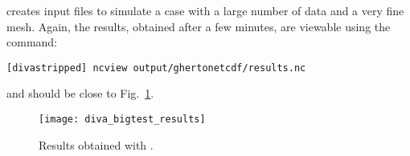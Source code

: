  creates input files to simulate a case with a large number of data and a very fine mesh. Again, the results, obtained after a few minutes, are viewable using the command:
\begin{lstlisting}[style=Bash]
[divastripped] ncview output/ghertonetcdf/results.nc
\end{lstlisting}
and should be close to Fig.~\ref{fig:diva_bigtest_results}.

\begin{figure}[H]
\centering 
\texttt{[image: diva\_bigtest\_results]}
\caption{Results obtained with .\label{fig:diva_bigtest_results}}
\end{figure}



%
%
%
%
%
%
%
%
%
%
%
%

